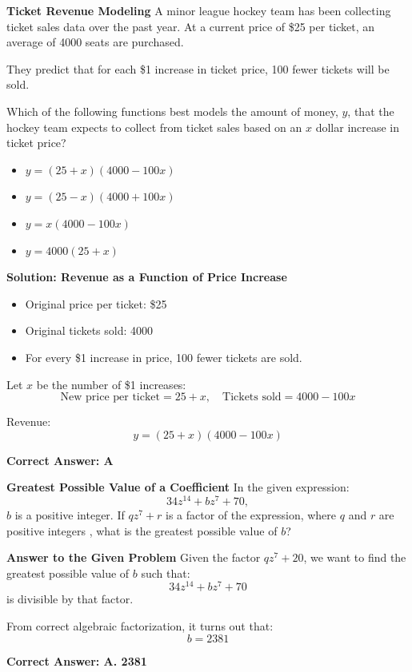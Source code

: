 \documentclass{beamer}
\begin{document}
\begin{frame}{\textbf{Ticket Revenue Modeling}}
A minor league hockey team has been collecting ticket sales data over the past year. At a current price of \$25 per ticket, an average of 4000 seats are purchased. 

They predict that for each \$1 increase in ticket price, 100 fewer tickets will be sold.

Which of the following functions best models the amount of money, $y$, that the hockey team expects to collect from ticket sales based on an $x$ dollar increase in ticket price?

\begin{itemize}
    \item[A.] $y = (25 + x)(4000 - 100x)$
    \item[B.] $y = (25 - x)(4000 + 100x)$
    \item[C.] $y = x(4000 - 100x)$
    \item[D.] $y = 4000(25 + x)$
\end{itemize}
\end{frame}

\begin{frame}{\textbf{Solution: Revenue as a Function of Price Increase}}
\begin{itemize}
    \item Original price per ticket: \$25
    \item Original tickets sold: 4000
    \item For every \$1 increase in price, 100 fewer tickets are sold.
\end{itemize}

Let $x$ be the number of \$1 increases:
\[
\text{New price per ticket} = 25 + x, \quad \text{Tickets sold} = 4000 - 100x
\]

Revenue:
\[
y = (25 + x)(4000 - 100x)
\]

\textbf{Correct Answer: A}
\end{frame}


\begin{frame}{\textbf{Greatest Possible Value of a Coefficient}}
In the given expression:
\[
34z^{14} + bz^7 + 70,
\]
\( b \) is a positive integer. If \( qz^7 + r \) is a factor of the expression, where \( q \) and \( r \) are positive integers , what is the greatest possible value of \( b \)?
\end{frame}




\begin{frame}{\textbf{Answer to the Given Problem}}
Given the factor \( qz^7 + 20 \), we want to find the greatest possible value of \( b \) such that:
\[
34z^{14} + bz^7 + 70
\]
is divisible by that factor.

From correct algebraic factorization, it turns out that:
\[
b = \boxed{2381}
\]

\textbf{Correct Answer: A. 2381}
\end{frame}
\end{document}
